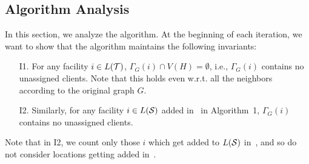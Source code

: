 \subsection{Algorithm Analysis}
In this section, we analyze the algorithm.
\medskip \noindent
At the beginning of each iteration, we want to show that the algorithm maintains the following invariants:
\begin{framed}
\begin{enumerate}%
	\item[I1.] For any facility $i\in L({\cal T})$, $\Gamma_G(i) \cap V(H) = \emptyset$, i.e., $\Gamma_G(i)$  contains no unassigned clients. Note that this holds even w.r.t. all the neighbors according to the original graph $G$.
\item[I2.] Similarly, for any facility $i \in L({\cal S})$  added in~ in Algorithm~1, $\Gamma_G(i)$ contains no unassigned clients.
\end{enumerate}
\end{framed}
Note that in I2, we count only those $i$ which get added to $L({\cal S})$ in~, and so do not consider locations getting added in~.

